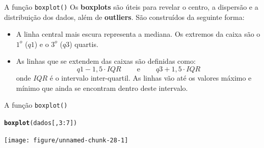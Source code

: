 \documentclass[10pt]{beamer}\usepackage[]{graphicx}\usepackage[]{color}
\makeatletter
\newcommand{\hlnum}[1]{\textcolor[rgb]{0.686,0.059,0.569}{#1}}%
\newcommand{\hlcom}[1]{\textcolor[rgb]{0.678,0.584,0.686}{\textit{#1}}}%
\newcommand{\hlopt}[1]{\textcolor[rgb]{0,0,0}{#1}}%
\newcommand{\hlstd}[1]{\textcolor[rgb]{0.345,0.345,0.345}{#1}}%
\newcommand{\hlkwd}[1]{\textcolor[rgb]{0.737,0.353,0.396}{\textbf{#1}}}%
\newenvironment{kframe}{%
 \def\at@end@of@kframe{}%
 \ifinner\ifhmode%
  \def\at@end@of@kframe{\end{minipage}}%
  \begin{minipage}{\columnwidth}%
 \fi\fi%
 \def\FrameCommand##1{\hskip\@totalleftmargin \hskip-\fboxsep
 \colorbox{shadecolor}{##1}\hskip-\fboxsep
     \hskip-\linewidth \hskip-\@totalleftmargin \hskip\columnwidth}%
 \MakeFramed {\advance\hsize-\width
   \@totalleftmargin\z@ \linewidth\hsize
   \@setminipage}}%
 {\par\unskip\endMakeFramed%
 \at@end@of@kframe}
\newenvironment{knitrout}{}{} %
\makeatother
\begin{document}

\begin{frame}[fragile]{A função \texttt{boxplot()}}
Os \textbf{boxplots} são úteis para revelar o centro, a dispersão e a
distribuição dos dados, além de \textbf{outliers}. São construídos da
seguinte forma:
\begin{itemize}
\item A linha central mais escura representa a mediana. Os extremos da
  caixa são o $1^{o}$ ($q1$) e o $3^{o}$ ($q3$) quartis.
\item As linhas que se extendem das caixas são definidas como:
\begin{displaymath}
q1-1,5\cdot IQR\ \qquad \mathrm{e}\ \qquad q3+1,5\cdot IQR
\end{displaymath}
onde $IQR$ é o intervalo inter-quartil. As linhas vão até os valores
máximo e mínimo que ainda se encontram dentro deste intervalo.
\end{itemize}
\end{frame}


\begin{frame}[fragile]{A função \texttt{boxplot()}}
\begin{knitrout}\small
{}\color{fgcolor}\begin{kframe}
\begin{alltt}
\hlkwd{boxplot}\hlstd{(dados[,} \hlnum{3}\hlopt{:}\hlnum{7}\hlstd{])}
\end{alltt}
\end{kframe}

{\centering \texttt{[image: figure/unnamed-chunk-28-1]} 

}



\end{knitrout}
\end{frame}
\end{document}
